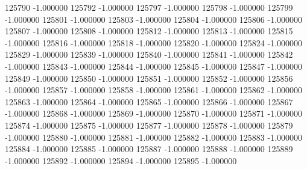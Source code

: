 125790   -1.000000
125792   -1.000000
125797   -1.000000
125798   -1.000000
125799   -1.000000
125801   -1.000000
125803   -1.000000
125804   -1.000000
125806   -1.000000
125807   -1.000000
125808   -1.000000
125812   -1.000000
125813   -1.000000
125815   -1.000000
125816   -1.000000
125818   -1.000000
125820   -1.000000
125824   -1.000000
125829   -1.000000
125839   -1.000000
125840   -1.000000
125841   -1.000000
125842   -1.000000
125843   -1.000000
125844   -1.000000
125845   -1.000000
125847   -1.000000
125849   -1.000000
125850   -1.000000
125851   -1.000000
125852   -1.000000
125856   -1.000000
125857   -1.000000
125858   -1.000000
125861   -1.000000
125862   -1.000000
125863   -1.000000
125864   -1.000000
125865   -1.000000
125866   -1.000000
125867   -1.000000
125868   -1.000000
125869   -1.000000
125870   -1.000000
125871   -1.000000
125874   -1.000000
125875   -1.000000
125877   -1.000000
125878   -1.000000
125879   -1.000000
125880   -1.000000
125881   -1.000000
125882   -1.000000
125883   -1.000000
125884   -1.000000
125885   -1.000000
125887   -1.000000
125888   -1.000000
125889   -1.000000
125892   -1.000000
125894   -1.000000
125895   -1.000000
